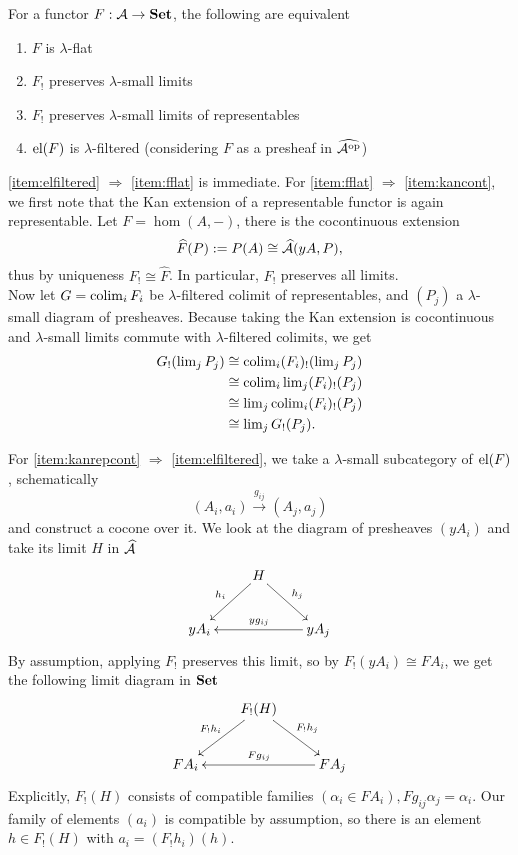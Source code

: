 \begin{Proposition}\label{prop:flat}
For a functor $F : \mathcal{A} \to \mathbf{Set}$, the following are equivalent
\begin{enumerate}
\item $F$ is $\lambda$-flat \label{item:fflat}
\item $F_!$ preserves $\lambda$-small limits
\item $F_!$ preserves $\lambda$-small limits of representables \label{item:kanrepcont}
\item $\textrm{el}(F)$ is $\lambda$-filtered (considering $F$ as a presheaf in $\widehat{\mathcal{A}^{\textrm{op}}}$) \label{item:elfiltered}
\end{enumerate}
\end{Proposition}
\begin{Proof}
\ref{item:elfiltered} $\Rightarrow$ \ref{item:fflat} is immediate. For \ref{item:fflat} $\Rightarrow$ \ref{item:kancont}, we first note that the Kan extension of a representable functor is again representable. Let $F=\hom(A,-)$, there is the cocontinuous extension \[ \widehat F(P) := P(A) \cong \widehat{\mathcal{A}}(yA,P), \]
thus by uniqueness $F_! \cong \widehat F$. In particular, $F_!$ preserves all limits. \\

Now let $G = \operatorname{colim}_i F_i$ be $\lambda$-filtered colimit of representables, and $(P_j)$ a $\lambda$-small diagram of presheaves. Because taking the Kan extension is cocontinuous and $\lambda$-small limits commute with $\lambda$-filtered colimits, we get
\begin{align*}
G_!(\operatorname{lim}_j P_j) &\cong \operatorname{colim}_i (F_i)_!(\operatorname{lim}_j P_j) \\
&\cong \operatorname{colim}_i \operatorname{lim}_j (F_i)_!(P_j) \\
&\cong \operatorname{lim}_j  \operatorname{colim}_i (F_i)_!(P_j) \\
&\cong \operatorname{lim}_j G_!(P_j).
\end{align*}

For \ref{item:kanrepcont} $\Rightarrow$ \ref{item:elfiltered}, we take a $\lambda$-small subcategory of $\textrm{el}(F)$, schematically
\[ (A_i,a_i) \xrightarrow{g_{ij}} (A_j,a_j) \]
and construct a cocone over it. We look at the diagram of presheaves $(yA_i)$ and take its limit $H$ in $\widehat{\mathcal{A}}$
\[
\xymatrix{
& H \ar[ld]_{h_i} \ar[rd]^{h_j} \\
yA_i & & yA_j \ar[ll]_{yg_{ij}}
}\]
By assumption, applying $F_!$ preserves this limit, so by $F_!(yA_i) \cong FA_i$, we get the following limit diagram in $\mathbf{Set}$
\[
\xymatrix{
& F_!(H) \ar[ld]_{F_!h_i} \ar[rd]^{F_!h_j} \\
FA_i & & FA_j \ar[ll]_{Fg_{ij}}
}\]
Explicitly, $F_!(H)$ consists of compatible families $(\alpha_i \in FA_i), Fg_{ij}\alpha_j = \alpha_i$. Our family of elements $(a_i)$ is compatible by assumption, so there is an element $h \in F_!(H)$ with $a_i = (F_!h_i)(h)$. \\


\end{Proof}
